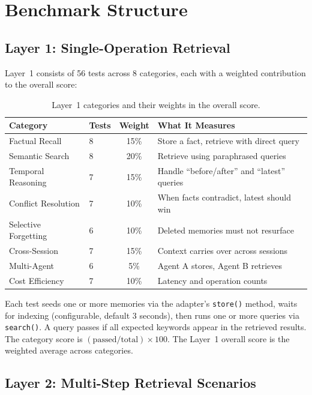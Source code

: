 \documentclass[11pt]{article}
\begin{document}
\section{Benchmark Structure}

\subsection{Layer 1: Single-Operation Retrieval}

Layer~1 consists of 56 tests across 8 categories, each with a weighted contribution to the overall score:

\begin{table}[h]
\centering
\begin{tabular}{llcl}
\toprule
\textbf{Category} & \textbf{Tests} & \textbf{Weight} & \textbf{What It Measures} \\
\midrule
Factual Recall & 8 & 15\% & Store a fact, retrieve with direct query \\
Semantic Search & 8 & 20\% & Retrieve using paraphrased queries \\
Temporal Reasoning & 7 & 15\% & Handle ``before/after'' and ``latest'' queries \\
Conflict Resolution & 7 & 10\% & When facts contradict, latest should win \\
Selective Forgetting & 6 & 10\% & Deleted memories must not resurface \\
Cross-Session & 7 & 15\% & Context carries over across sessions \\
Multi-Agent & 6 & 5\% & Agent A stores, Agent B retrieves \\
Cost Efficiency & 7 & 10\% & Latency and operation counts \\
\bottomrule
\end{tabular}
\caption{Layer~1 categories and their weights in the overall score.}
\label{tab:categories}
\end{table}

Each test seeds one or more memories via the adapter's \texttt{store()} method, waits for indexing (configurable, default 3 seconds), then runs one or more queries via \texttt{search()}. A query passes if all expected keywords appear in the retrieved results. The category score is $(\text{passed} / \text{total}) \times 100$. The Layer~1 overall score is the weighted average across categories.

\subsection{Layer 2: Multi-Step Retrieval Scenarios}
\end{document}
